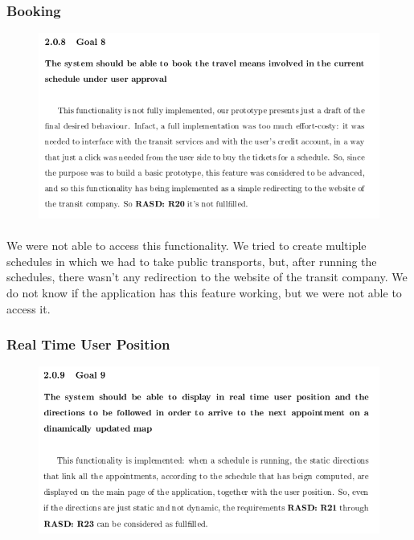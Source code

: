 \documentclass{article}
\begin{document}
			\subsubsection{Booking}
			\begin{figure}[H]
			\includegraphics[width=\linewidth]{Images/Goals/Goal_8.png}
			\label{fig:G8}
			\end{figure}
			\paragraph{}We were not able to access this functionality. We tried to create multiple schedules in which we had to take public transports, but, after running the schedules, there wasn’t any redirection to the website of the transit company. We do not know if the application has this feature working, but we were not able to access it. 
			\subsubsection{Real Time User Position}
			\begin{figure}[H]
			\includegraphics[width=\linewidth]{Images/Goals/Goal_9.png}
			\label{fig:G9}
			\end{figure}
\end{document}
